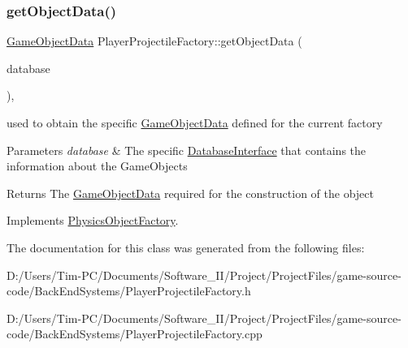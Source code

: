 \subsubsection{\texorpdfstring{get\+Object\+Data()}{getObjectData()}}
{\footnotesize\ttfamily \hyperlink{struct_game_object_data}{Game\+Object\+Data} Player\+Projectile\+Factory\+::get\+Object\+Data (\begin{DoxyParamCaption}\item[{const std\+::shared\+\_\+ptr$<$ \hyperlink{class_database_interface}{Database\+Interface} $>$ \&}]{database }\end{DoxyParamCaption})\hspace{0.3cm}{\ttfamily [override]}, {\ttfamily [virtual]}}



used to obtain the specific \hyperlink{struct_game_object_data}{Game\+Object\+Data} defined for the current factory 


\begin{DoxyParams}{Parameters}
{\em database} & The specific \hyperlink{class_database_interface}{Database\+Interface} that contains the information about the Game\+Objects \\
\hline
\end{DoxyParams}
\begin{DoxyReturn}{Returns}
The \hyperlink{struct_game_object_data}{Game\+Object\+Data} required for the construction of the object 
\end{DoxyReturn}


Implements \hyperlink{class_physics_object_factory_aa59f52d3adc1fac676f4a8a3c2de9ba9}{Physics\+Object\+Factory}.



The documentation for this class was generated from the following files\+:\begin{DoxyCompactItemize}
\item 
D\+:/\+Users/\+Tim-\/\+P\+C/\+Documents/\+Software\+\_\+\+I\+I/\+Project/\+Project\+Files/game-\/source-\/code/\+Back\+End\+Systems/Player\+Projectile\+Factory.\+h\item 
D\+:/\+Users/\+Tim-\/\+P\+C/\+Documents/\+Software\+\_\+\+I\+I/\+Project/\+Project\+Files/game-\/source-\/code/\+Back\+End\+Systems/Player\+Projectile\+Factory.\+cpp\end{DoxyCompactItemize}
